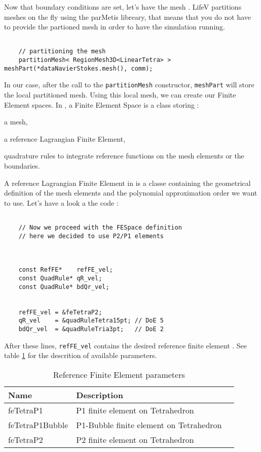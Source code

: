 {Now that boundary conditions are set, let's have the mesh . LifeV partitions meshes on the fly
using the parMetis libreary, that means that you do not have to provide the partioned mesh in
order to have the simulation running.

\begin{verbatim}

    // partitioning the mesh
    partitionMesh< RegionMesh3D<LinearTetra> >   meshPart(*dataNavierStokes.mesh(), comm);

\end{verbatim}

In our case, after the call to the \verb!partitionMesh! constructor, \verb!meshPart! will store
the local partitioned mesh. Using this local mesh, we can create our Finite Element  spaces.
In \lifev, a Finite Element Space is a class storing :
\begin{description}
\item a mesh,
\item a reference Lagrangian Finite Element,
\item quadrature rules to integrate reference functions on the mesh elements or the boundaries.
\end{description}
A reference Lagrangian Finite Element in \lifev is a classe containing the geometrical definition
of the mesh elements and the polynomial approximation order we want to use.
Let's have a look a the code :

\begin{verbatim}

    // Now we proceed with the FESpace definition
    // here we decided to use P2/P1 elements



    const RefFE*    refFE_vel;
    const QuadRule* qR_vel;
    const QuadRule* bdQr_vel;


    refFE_vel = &feTetraP2;
    qR_vel    = &quadRuleTetra15pt; // DoE 5
    bdQr_vel  = &quadRuleTria3pt;   // DoE 2

\end{verbatim}

After these lines, \verb!refFE_vel! contains the desired reference finite element  . See table \ref{table-feapproxorder}
for the descrition of available parameters.

\begin{table}
\begin{center}
\begin{tabular}{|l|l|l|}
\hline
Name  & Description \\
\hline \hline
feTetraP1 & P1 finite element on Tetrahedron \\
feTetraP1Bubble & P1-Bubble finite element on Tetrahedron \\
feTetraP2 & P2 finite element on Tetrahedron \\
\hline
\end{tabular}
\end{center}
\caption{ Reference Finite Element parameters}
\label{table-feapproxorder}
\end{table}

}
